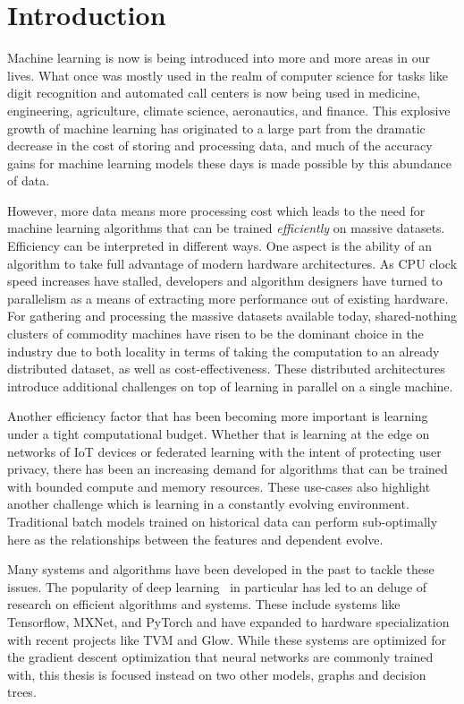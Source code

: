 \chapter{Introduction}

Machine learning is now is being introduced into more and more areas in
our lives. What once was mostly used in the realm of computer science for
tasks like digit recognition and automated call centers is now being used
in medicine, engineering, agriculture, climate science, aeronautics,
and finance. This explosive growth of machine learning has originated
to a large part from the dramatic decrease in the cost of storing and processing
data, and much of the accuracy gains for machine learning models these
days is made possible by this abundance of data.

However, more data means more processing cost which leads to the need for
machine learning algorithms that can be trained \emph{efficiently} on massive
datasets. Efficiency can be interpreted in different ways. One
aspect is the ability of an algorithm to take full advantage of modern
hardware architectures. As CPU clock speed increases have stalled, developers
and algorithm designers have turned to parallelism as a means of
extracting more performance out of existing hardware.
For gathering and processing the massive datasets available today,
shared-nothing clusters of commodity machines have risen to
be the dominant choice in the industry due to both locality
in terms of taking the computation to an already distributed
dataset, as well as cost-effectiveness. These distributed
architectures introduce additional challenges on top of
learning in parallel on a single machine.

Another efficiency factor that has been becoming more important
is learning under a tight computational budget. Whether that
is learning at the edge on networks of IoT devices or federated
learning with the intent of protecting user privacy, there has
been an increasing demand for algorithms that can be trained
with bounded compute and memory resources.
These use-cases also highlight another challenge which is learning
in a constantly evolving environment. Traditional batch
models trained on historical data can perform sub-optimally here as the
relationships between the features and dependent evolve.

Many systems and algorithms have been developed in the past to
tackle these issues. The popularity of deep learning~\cite{deep-learning}
in particular has led to an deluge of research on efficient
algorithms and systems. These include systems like Tensorflow, MXNet,
and PyTorch and have expanded to hardware specialization with recent projects
like TVM and Glow. While these systems are optimized for the gradient
descent optimization that neural networks are commonly trained with,
this thesis is focused instead on two other models, graphs and decision
trees.

